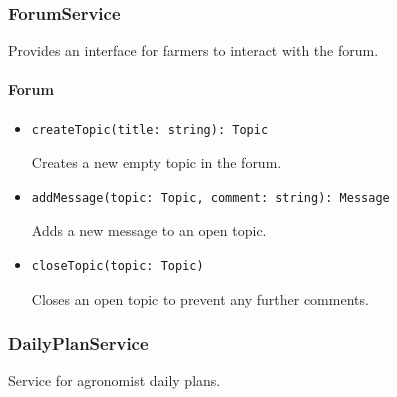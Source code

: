 \documentclass{article}
\begin{document}
\subsubsection{ForumService}
Provides an interface for farmers to interact with the forum.

\paragraph{Forum}
\begin{itemize}
\item \begin{verbatim}
createTopic(title: string): Topic
\end{verbatim}
Creates a new empty topic in the forum.
\item \begin{verbatim}
addMessage(topic: Topic, comment: string): Message
\end{verbatim}
Adds a new message to an open topic.
\item \begin{verbatim}
closeTopic(topic: Topic)
\end{verbatim}
Closes an open topic to prevent any further comments.
\end{itemize}

\subsubsection{DailyPlanService}
Service for agronomist daily plans.
\end{document}
